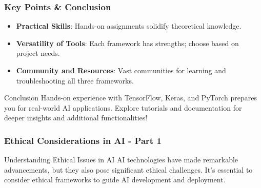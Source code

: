 \documentclass{beamer}
\begin{document}
\begin{frame}
    \frametitle{Key Points \& Conclusion}
    \begin{itemize}
        \item \textbf{Practical Skills}: Hands-on assignments solidify theoretical knowledge.
        \item \textbf{Versatility of Tools}: Each framework has strengths; choose based on project needs.
        \item \textbf{Community and Resources}: Vast communities for learning and troubleshooting all three frameworks.
    \end{itemize}
    \begin{block}{Conclusion}
        Hands-on experience with TensorFlow, Keras, and PyTorch prepares you for real-world AI applications. 
        Explore tutorials and documentation for deeper insights and additional functionalities!
    \end{block}
\end{frame}

\begin{frame}[fragile]
    \frametitle{Ethical Considerations in AI - Part 1}
    \begin{block}{Understanding Ethical Issues in AI}
        AI technologies have made remarkable advancements, but they also pose significant ethical challenges. It's essential to consider ethical frameworks to guide AI development and deployment.
    \end{block}
\end{frame}
\end{document}
